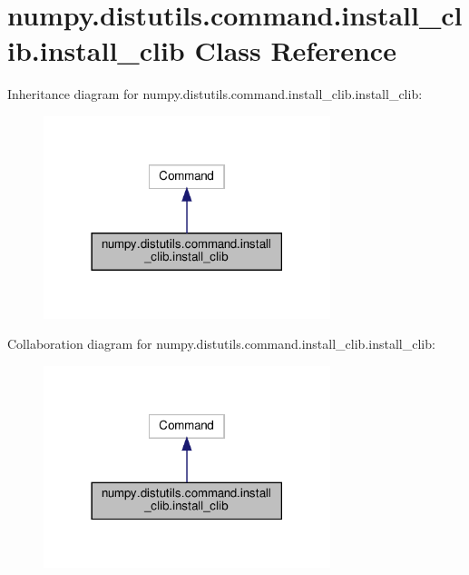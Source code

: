 \hypertarget{classnumpy_1_1distutils_1_1command_1_1install__clib_1_1install__clib}{}\section{numpy.\+distutils.\+command.\+install\+\_\+clib.\+install\+\_\+clib Class Reference}
\label{classnumpy_1_1distutils_1_1command_1_1install__clib_1_1install__clib}


Inheritance diagram for numpy.\+distutils.\+command.\+install\+\_\+clib.\+install\+\_\+clib\+:
\nopagebreak
\begin{figure}[H]
\begin{center}
\leavevmode
\includegraphics[width=237pt]{classnumpy_1_1distutils_1_1command_1_1install__clib_1_1install__clib__inherit__graph}
\end{center}
\end{figure}


Collaboration diagram for numpy.\+distutils.\+command.\+install\+\_\+clib.\+install\+\_\+clib\+:
\nopagebreak
\begin{figure}[H]
\begin{center}
\leavevmode
\includegraphics[width=237pt]{classnumpy_1_1distutils_1_1command_1_1install__clib_1_1install__clib__coll__graph}
\end{center}
\end{figure}
